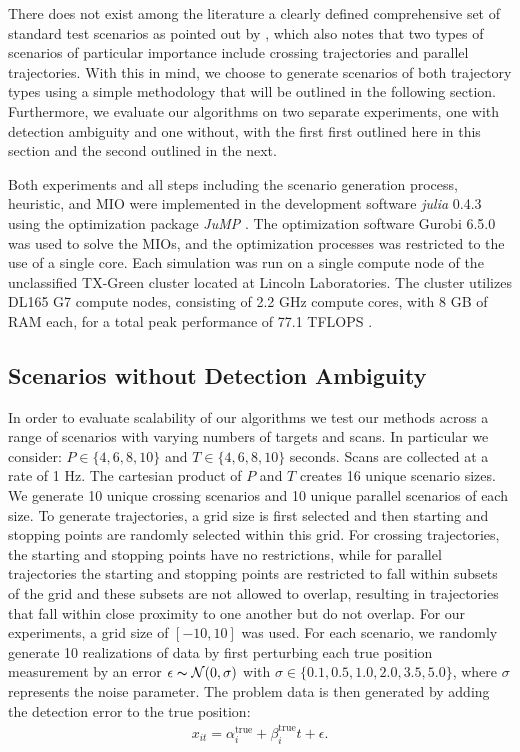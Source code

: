 There does not exist among the literature a clearly defined comprehensive set of standard test scenarios as pointed out by \cite{MTT-Taxonomy}, which also notes that two types of scenarios of particular importance include crossing trajectories and parallel trajectories. With this in mind, we choose to generate scenarios of both trajectory types using a simple methodology that will be outlined in the following section. Furthermore, we evaluate our algorithms on two separate experiments, one with detection ambiguity and one without, with the first first outlined here in this section and the second outlined in the next. 

Both experiments and all steps including the scenario generation process, heuristic, and MIO were implemented in the development software \textit{julia} 0.4.3 \cite{julia} using the optimization package \textit{JuMP} \cite{JuMP}. The optimization software Gurobi 6.5.0 \cite{gurobi} was used to solve the MIOs, and the optimization processes was restricted to the use of a single core. Each simulation was run on a single compute node of the unclassified TX-Green cluster located at Lincoln Laboratories. The cluster utilizes DL165 G7 compute nodes, consisting of 2.2 GHz compute cores, with 8 GB of RAM each, for a total peak performance of 77.1 TFLOPS \cite{LLGrid}. 

\subsection{Scenarios without Detection Ambiguity}
In order to evaluate scalability of our algorithms we test our methods across a range of scenarios with varying numbers of targets and scans. In particular we consider: $ P \in \{4,6,8,10\}$ and $T \in \{4,6,8,10\}$ seconds. Scans are collected at a rate of 1 Hz. The cartesian product of $P$ and $T$ creates 16 unique scenario sizes. We generate 10 unique crossing scenarios and 10 unique parallel scenarios of each size. To generate trajectories, a grid size is first selected and then starting and stopping points are randomly selected within this grid. For crossing trajectories, the starting and stopping points have no restrictions, while for parallel trajectories the starting and stopping points are restricted to fall within subsets of the grid and these subsets are not allowed to overlap, resulting in trajectories that fall within close proximity to one another but do not overlap. For our experiments, a grid size of $[-10,10]$ was used. For each scenario, we randomly generate 10 realizations of data by first perturbing each true position measurement by an error $\epsilon \thicksim \mathcal{N}(0,\sigma)$ with $\sigma \in \{0.1,0.5,1.0,2.0,3.5,5.0\}$, where $\sigma$ represents the noise parameter. The problem data is then generated by adding the detection error to the true position:
\begin{align}
	x_{it} = \alpha^{\text{true}}_{i} + \beta^{\text{true}}_{i}t+\epsilon.
\end{align}

